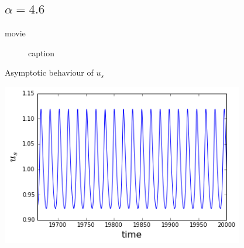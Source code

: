 \documentclass{beamer}
\begin{document}
\subsection{$\alpha = 4.6$}
\begin{frame}{movie}
	\begin{figure}[h!]
		\centering    
		\caption{caption}
	\end{figure} 
\end{frame}
\begin{frame}{Asymptotic behaviour of $u_s$}
	\begin{center}
		\includegraphics[height=200pt]{46}\\
		
	\end{center}	
\end{frame}
\end{document}
